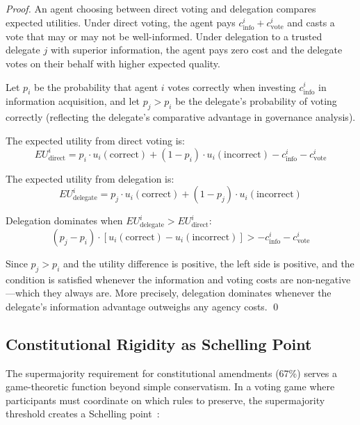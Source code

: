 \begin{proof}
An agent choosing between direct voting and delegation compares expected
utilities. Under direct voting, the agent pays $c_{\text{info}}^i +
c_{\text{vote}}^i$ and casts a vote that may or may not be well-informed.
Under delegation to a trusted delegate $j$ with superior information, the
agent pays zero cost and the delegate votes on their behalf with higher
expected quality.

Let $p_i$ be the probability that agent $i$ votes correctly when investing
$c_{\text{info}}^i$ in information acquisition, and let $p_j > p_i$ be the
delegate's probability of voting correctly (reflecting the delegate's
comparative advantage in governance analysis).

The expected utility from direct voting is:
\begin{equation}
  EU_{\text{direct}}^i = p_i \cdot u_i(\text{correct}) + (1 - p_i) \cdot u_i(\text{incorrect}) - c_{\text{info}}^i - c_{\text{vote}}^i
  \label{eq:eu-direct}
\end{equation}

The expected utility from delegation is:
\begin{equation}
  EU_{\text{delegate}}^i = p_j \cdot u_i(\text{correct}) + (1 - p_j) \cdot u_i(\text{incorrect})
  \label{eq:eu-delegate}
\end{equation}

Delegation dominates when $EU_{\text{delegate}}^i > EU_{\text{direct}}^i$:
\begin{equation}
  (p_j - p_i) \cdot [u_i(\text{correct}) - u_i(\text{incorrect})] > -c_{\text{info}}^i - c_{\text{vote}}^i
  \label{eq:delegation-dominance}
\end{equation}

Since $p_j > p_i$ and the utility difference is positive, the left side is
positive, and the condition is satisfied whenever the information and voting
costs are non-negative---which they always are. More precisely, delegation
dominates whenever the delegate's information advantage outweighs any
agency costs. \qed
\end{proof}

\subsection{Constitutional Rigidity as Schelling Point}
\label{subsec:schelling}

The supermajority requirement for constitutional amendments (67\%) serves a
game-theoretic function beyond simple conservatism. In a voting game where
participants must coordinate on which rules to preserve, the supermajority
threshold creates a Schelling point~\citep{fudenberg1991game}:

